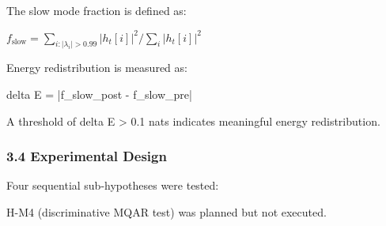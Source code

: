 The slow mode fraction is defined as:

$f_\text{slow} = \sum_{i: |\lambda_i| > 0.99} |h_t[i]|^2 / \sum_i |h_t[i]|^2$

Energy redistribution is measured as:

delta E = |f\_slow\_post - f\_slow\_pre|

A threshold of delta E > 0.1 nats indicates meaningful energy redistribution.

\subsubsection{3.4 Experimental Design}

Four sequential sub-hypotheses were tested:

\begin{table}[htbp]
\centering
{}
\end{table}

H-M4 (discriminative MQAR test) was planned but not executed.

